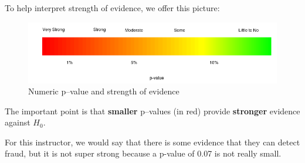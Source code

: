  To help interpret strength of evidence, we offer this picture:
 \begin{figure}[h]
   \centering
\includegraphics[width=\linewidth]{../plots/pvalueStrengths.png}
   \caption{Numeric p--value and strength of evidence}
   \label{fig:SOE-pvalue}
 \end{figure}

  The important point is that {\bf smaller} p--values (in red) provide {\bf
    stronger} evidence against $H_0$. 

  For this instructor, we would say that there is some evidence that
  they can detect fraud, but it is not super strong because a p-value
  of 0.07 is not really small.

